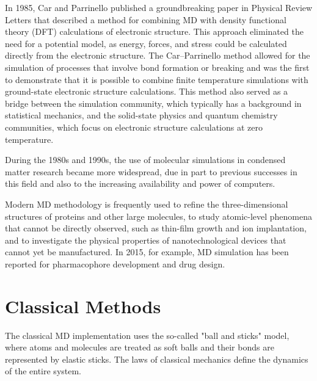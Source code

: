 In 1985, Car and Parrinello published a groundbreaking paper in Physical
Review Letters that described a method for combining MD with density
functional theory (DFT) calculations of electronic structure. This approach
eliminated the need for a potential model, as energy, forces, and stress
could be calculated directly from the electronic structure. The Car–Parrinello
method allowed for the simulation of processes that involve bond formation or
breaking and was the first to demonstrate that it is possible to combine
finite temperature simulations with ground-state electronic structure
calculations. This method also served as a bridge between the simulation
community, which typically has a background in statistical mechanics, and the
solid-state physics and quantum chemistry communities, which focus on
electronic structure calculations at zero temperature.

During the 1980s and 1990s, the use of molecular simulations in condensed
matter research became more widespread, due in part to previous successes in
this field and also to the increasing availability and power of computers.

Modern MD methodology is frequently used to refine the three-dimensional
structures of proteins and other large molecules, to study atomic-level
phenomena that cannot be directly observed, such as thin-film growth and ion
implantation, and to investigate the physical properties of nanotechnological
devices that cannot yet be manufactured. In 2015, for example, MD simulation
has been reported for pharmacophore development and drug design.

\section{Classical Methods}

The classical MD implementation uses the so-called "ball and sticks" model,
where atoms and molecules are treated as soft balls and their bonds are
represented by elastic sticks. The laws of classical mechanics define the
dynamics of the entire system.

